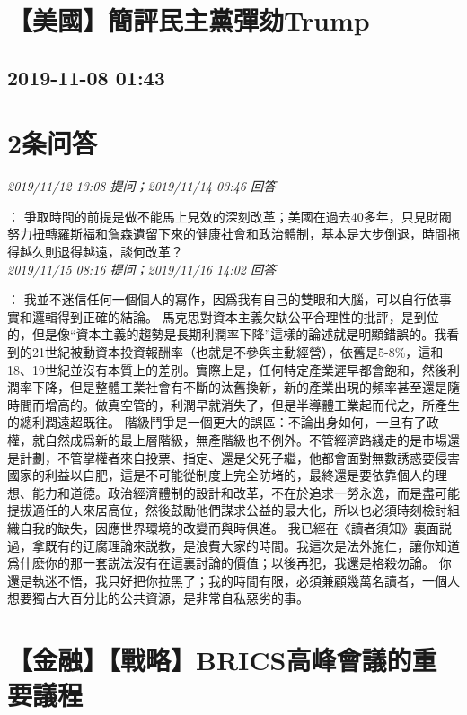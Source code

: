 \documentclass[twocolumn]{ctexart}
\begin{document}
\section{【美國】簡評民主黨彈劾Trump}
\subsection{2019-11-08 01:43}


\section{2条问答}

\textit{\hfill\noindent\small 2019/11/12 13:08 提问；2019/11/14 03:46 回答}

：
爭取時間的前提是做不能馬上見效的深刻改革；美國在過去40多年，只見財閥努力扭轉羅斯福和詹森遺留下來的健康社會和政治體制，基本是大步倒退，時間拖得越久則退得越遠，談何改革？
\\

\textit{\hfill\noindent\small 2019/11/15 08:16 提问；2019/11/16 14:02 回答}

：
我並不迷信任何一個個人的寫作，因爲我有自己的雙眼和大腦，可以自行依事實和邏輯得到正確的結論。 
馬克思對資本主義欠缺公平合理性的批評，是到位的，但是像“資本主義的趨勢是長期利潤率下降”這樣的論述就是明顯錯誤的。我看到的21世紀被動資本投資報酬率（也就是不參與主動經營），依舊是5-8\%，這和18、19世紀並沒有本質上的差別。實際上是，任何特定產業遲早都會飽和，然後利潤率下降，但是整體工業社會有不斷的汰舊換新，新的產業出現的頻率甚至還是隨時間而增高的。做真空管的，利潤早就消失了，但是半導體工業起而代之，所產生的總利潤遠超既往。 
階級鬥爭是一個更大的誤區：不論出身如何，一旦有了政權，就自然成爲新的最上層階級，無產階級也不例外。不管經濟路綫走的是市場還是計劃，不管掌權者來自投票、指定、還是父死子繼，他都會面對無數誘惑要侵害國家的利益以自肥，這是不可能從制度上完全防堵的，最終還是要依靠個人的理想、能力和道德。政治經濟體制的設計和改革，不在於追求一勞永逸，而是盡可能提拔適任的人來居高位，然後鼓勵他們謀求公益的最大化，所以也必須時刻檢討組織自我的缺失，因應世界環境的改變而與時俱進。 
我已經在《讀者須知》裏面説過，拿既有的迂腐理論來説教，是浪費大家的時間。我這次是法外施仁，讓你知道爲什麽你的那一套説法沒有在這裏討論的價值；以後再犯，我還是格殺勿論。 
你還是執迷不悟，我只好把你拉黑了；我的時間有限，必須兼顧幾萬名讀者，一個人想要獨占大百分比的公共資源，是非常自私惡劣的事。
\\


\section{【金融】【戰略】BRICS高峰會議的重要議程}
\end{document}
